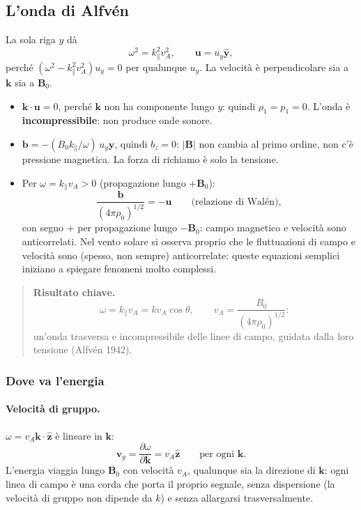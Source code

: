 \subsection{L'onda di Alfvén}

La sola riga $y$ dà
\begin{equation}
\omega^2=k_\parallel^2v_A^2,\qquad\mathbf{u}=u_y\hat{\mathbf{y}},
\end{equation}
perché $(\omega^2-k_\parallel^2v_A^2)u_y=0$ per qualunque $u_y$. La velocità è perpendicolare sia a $\mathbf{k}$ sia a $\mathbf{B}_0$.
\begin{itemize}
\item $\mathbf{k}\cdot\mathbf{u}=0$, perché $\mathbf{k}$ non ha componente lungo $y$: quindi $\rho_1=p_1=0$. L'onda è \textbf{incompressibile}: non produce onde sonore.
\item $\mathbf{b}=-(B_0k_\parallel/\omega)\,u_y\hat{\mathbf{y}}$, quindi $b_z=0$: $|\mathbf{B}|$ non cambia al primo ordine, non c'è pressione magnetica. La forza di richiamo è solo la tensione.
\item Per $\omega=k_\parallel v_A>0$ (propagazione lungo $+\mathbf{B}_0$):
\begin{equation}
\frac{\mathbf{b}}{(4\pi\rho_0)^{1/2}}=-\mathbf{u}\qquad\text{(relazione di Walén)},
\end{equation}
con segno $+$ per propagazione lungo $-\mathbf{B}_0$: campo magnetico e velocità sono anticorrelati. Nel vento solare si osserva proprio che le fluttuazioni di campo e velocità sono (spesso, non sempre) anticorrelate: queste equazioni semplici iniziano a spiegare fenomeni molto complessi.
\end{itemize}

\begin{quote}
\textbf{Risultato chiave.}
\[
\omega=k_\parallel v_A=kv_A\cos\theta,\qquad v_A=\frac{B_0}{(4\pi\rho_0)^{1/2}}:
\]
un'onda trasversa e incompressibile delle linee di campo, guidata dalla loro tensione (Alfvén 1942).
\end{quote}

\subsubsection{Dove va l'energia}

\paragraph{Velocità di gruppo.} $\omega=v_A\mathbf{k}\cdot\hat{\mathbf{z}}$ è lineare in $\mathbf{k}$:
\begin{equation}
\mathbf{v}_g=\frac{\partial\omega}{\partial\mathbf{k}}=v_A\hat{\mathbf{z}}\qquad\text{per ogni }\mathbf{k}.
\end{equation}
L'energia viaggia lungo $\mathbf{B}_0$ con velocità $v_A$, qualunque sia la direzione di $\mathbf{k}$: ogni linea di campo è una corda che porta il proprio segnale, senza dispersione (la velocità di gruppo non dipende da $k$) e senza allargarsi trasversalmente.

